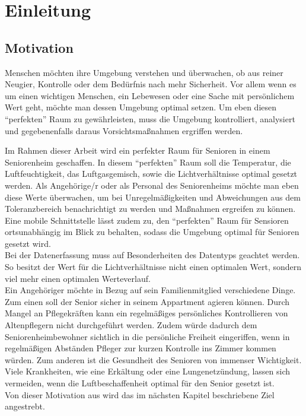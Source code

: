 \chapter{Einleitung}

\section{Motivation}
Menschen möchten ihre Umgebung verstehen und überwachen, ob aus reiner Neugier, Kontrolle oder dem Bedürfnis nach mehr Sicherheit. Vor allem wenn es um einen wichtigen Menschen, ein Lebewesen oder eine Sache mit persönlichem Wert geht, möchte man dessen Umgebung optimal setzen. Um eben diesen ``perfekten'' Raum zu gewährleisten, muss die Umgebung kontrolliert, analysiert und gegebenenfalls daraus Vorsichtsmaßnahmen ergriffen werden.

Im Rahmen dieser Arbeit wird ein perfekter Raum für Senioren in einem Seniorenheim geschaffen. In diesem ``perfekten'' Raum soll die Temperatur, die Luftfeuchtigkeit, das Luftgasgemisch, sowie die Lichtverhältnisse optimal gesetzt werden. Als Angehörige/r oder als Personal des Seniorenheims möchte man eben diese Werte überwachen, um bei Unregelmäßigkeiten und Abweichungen aus dem Toleranzbereich benachrichtigt zu werden und Maßnahmen ergreifen zu können.\\Eine mobile Schnittstelle lässt zudem zu, den ``perfekten'' Raum für Sensioren ortsunabhängig im Blick zu behalten, sodass die Umgebung optimal für Senioren gesetzt wird.\\Bei der Datenerfassung muss auf Besonderheiten des Datentyps geachtet werden. So besitzt der Wert für die Lichtverhältnisse nicht einen optimalen Wert, sondern viel mehr einen optimalen Werteverlauf.\\
Ein Angehöriger möchte in Bezug auf sein Familienmitglied verschiedene Dinge. Zum einen soll der Senior sicher in seinem Appartment agieren können. Durch Mangel an Pflegekräften kann ein regelmäßiges persönliches Kontrollieren von Altenpflegern nicht durchgeführt werden. Zudem würde dadurch dem Seniorenheimbewohner sichtlich in die persönliche Freiheit eingeriffen, wenn in regelmäßigen Abständen Pfleger zur kurzen Kontrolle ins Zimmer kommen würden. Zum anderen ist die Gesundheit des Senioren von immenser Wichtigkeit. Viele Krankheiten, wie eine Erkältung oder eine Lungenetzündung, lassen sich vermeiden, wenn die Luftbeschaffenheit optimal für den Senior gesetzt ist.\\
Von dieser Motivation aus wird das im nächsten Kapitel beschriebene Ziel angestrebt.
